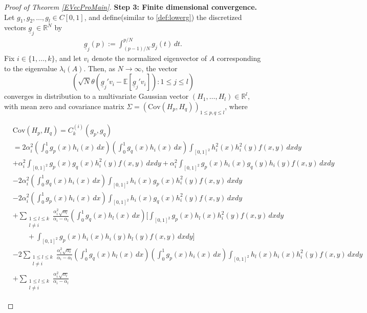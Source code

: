 \documentclass[11pt, reqno]{amsart}
\numberwithin{equation}{section}
\begin{document}
\begin{proof}[Proof of Theorem \ref{EVecProMain}]
\noindent\textbf{Step 3: Finite dimensional convergence.}
Let $g_1, g_2, \ldots, g_l \in C[0,1]$, and define(similar to \eqref{def:lowerg}) the discretized vectors $\underline{g}_j \in \mathbb{R}^N$ by
\begin{align}
\underline{g}_j(p) := \int_{(p-1)/N}^{p/N} g_j(t)\, dt.
\end{align}
Fix \( i \in \{1,\ldots,k\} \), and let \( v_i \) denote the normalized eigenvector of \( A \) corresponding to the eigenvalue \( \lambda_i(A) \). Then, as \( N \to \infty \), the vector
\[
\left( \sqrt{N} \theta \left( \underline{g}_j' v_i - \mathbb{E}[\underline{g}_j' v_i] \right) : 1 \le j \le l \right)
\]
converges in distribution to a multivariate Gaussian vector \( (H_1, \ldots, H_l) \in \mathbb{R}^l \), with mean zero and covariance matrix \( \Sigma = (\mathrm{Cov}(H_p, H_q))_{1 \le p,q \le l} \), where
\begin{small}
\begin{align}
\label{covarianceform}
&\mathrm{Cov}(H_p, H_q) = C_k^{(i)}(g_p, g_q)\\
&=2\alpha_i^2 \left( \int_0^1 g_p(x) h_i(x)\, dx \right) \left( \int_0^1 g_q(x) h_i(x)\, dx \right) \int_{[0,1]^2} h_i^2(x) h_i^2(y) f(x,y)\, dxdy \nonumber\\
\nonumber
& + \alpha_i^2 \int_{[0,1]^2} g_p(x) g_q(x) h_i^2(y) f(x,y)\, dxdy 
+ \alpha_i^2 \int_{[0,1]^2} g_p(x) h_i(x) g_q(y) h_i(y) f(x,y)\, dxdy \\
\nonumber
& - 2\alpha_i^2 \left( \int_0^1 g_q(x) h_i(x)\, dx \right) \int_{[0,1]^2} h_i(x) g_p(x) h_i^2(y) f(x,y)\, dxdy \\
\nonumber
& - 2\alpha_i^2 \left( \int_0^1 g_p(x) h_i(x)\, dx \right) \int_{[0,1]^2} h_i(x) g_q(x) h_i^2(y) f(x,y)\, dxdy \\
\nonumber
& + \sum_{\substack{1 \le l \le k \\ l \ne i}} \frac{\alpha_i^2 \sqrt{\alpha_l}}{\alpha_i - \alpha_l} 
\left( \int_0^1 g_q(x) h_l(x)\, dx \right)
\Bigg[
\int_{[0,1]^2} g_p(x) h_l(x) h_i^2(y) f(x,y)\, dxdy \\
\nonumber
& \qquad + \int_{[0,1]^2} g_p(x) h_i(x) h_i(y) h_l(y) f(x,y)\, dxdy
\Bigg] \\
\nonumber
& - 2\sum_{\substack{1 \le l \le k \\ l \ne i}} \frac{\alpha_i^2 \sqrt{\alpha_l}}{\alpha_i - \alpha_l} 
\left( \int_0^1 g_q(x) h_l(x)\, dx \right)
\left( \int_0^1 g_p(x) h_i(x)\, dx \right)
\int_{[0,1]^2} h_l(x) h_i(x) h_i^2(y) f(x,y)\, dxdy \\
\nonumber
& + \sum_{\substack{1 \le l \le k \\ l \ne i}} \frac{\alpha_i^2 \sqrt{\alpha_l}}{\alpha_i - \alpha_l} 

\end{align}
\end{small}
\end{proof}
\end{document}

